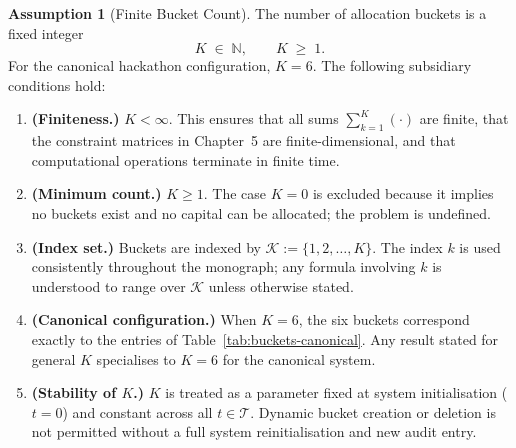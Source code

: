 \documentclass[12pt,openany]{book}
\numberwithin{equation}{chapter}
\theoremstyle{plain}
\theoremstyle{definition}
\newtheorem{assumption}[theorem]{Assumption}
\theoremstyle{remark}
\numberwithin{equation}{chapter}
\theoremstyle{plain}
\begin{document}
\begin{assumption}[Finite Bucket Count]
\label{asm:bucket-count}
The number of allocation buckets is a fixed integer
\begin{equation}
  K \;\in\; \mathbb{N}, \qquad K \;\geq\; 1.
  \label{eq:bucket-count}
\end{equation}
For the canonical hackathon configuration, $K = 6$.
The following subsidiary conditions hold:
\begin{enumerate}[label=\textbf{(BC\arabic*)}]
  \item \textbf{(Finiteness.)}
        $K < \infty$.  This ensures that all sums
        $\sum_{k=1}^{K}(\cdot)$ are finite, that the constraint
        matrices in Chapter~5 are finite-dimensional, and that
        computational operations terminate in finite time.

  \item \textbf{(Minimum count.)}
        $K \geq 1$.  The case $K = 0$ is excluded because it implies
        no buckets exist and no capital can be allocated; the problem
        is undefined.

  \item \textbf{(Index set.)}
        Buckets are indexed by
        $\mathcal{K} := \{1, 2, \ldots, K\}$.
        The index $k$ is used consistently throughout the monograph;
        any formula involving $k$ is understood to range over
        $\mathcal{K}$ unless otherwise stated.

  \item \textbf{(Canonical configuration.)}
        When $K = 6$, the six buckets correspond exactly to the
        entries of Table~\ref{tab:buckets-canonical}.  Any result
        stated for general $K$ specialises to $K = 6$ for the
        canonical system.

  \item \textbf{(Stability of $K$.)}
        $K$ is treated as a parameter fixed at system initialisation
        ($t = 0$) and constant across all $t \in \mathcal{T}$.
        Dynamic bucket creation or deletion is not permitted without
        a full system reinitialisation and new audit entry.
\end{enumerate}
\end{assumption}
\end{document}
